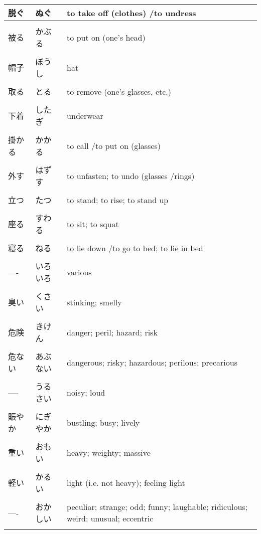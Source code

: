 \documentclass{article}
\begin{document}
\begin{tabular}{ l | p{4cm} p{12cm} }
脱ぐ & ぬぐ & to take off (clothes) /to undress \\ \hline\\[-1em]
被る & かぶる & to put on (one's head) \\ \hline\\[-1em]
帽子 & ぼうし & hat	 \\ \hline\\[-1em]
取る & とる & to remove (one's glasses, etc.) \\ \hline\\[-1em]
下着 & したぎ & underwear \\ \hline\\[-1em]
掛かる & かかる & to call /to put on (glasses) \\ \hline\\[-1em]
外す & はずす & to unfasten; to undo​ (glasses /rings) \\ \hline\\[-1em]
立つ & たつ & to stand; to rise; to stand up​  \\ \hline\\[-1em]
座る & すわる & to sit; to squat​ \\ \hline\\[-1em]
寝る & ねる & to lie down​ /to go to bed; to lie in bed​ \\ \hline\\[-1em]
---- & いろいろ & various \\ \hline\\[-1em]
臭い & くさい & stinking; smelly​ \\ \hline\\[-1em]
危険 & きけん & danger; peril; hazard​; risk \\ \hline\\[-1em]
危ない & あぶない & dangerous; risky; hazardous; perilous; precarious​ \\ \hline\\[-1em]
---- & うるさい & noisy; loud \\ \hline\\[-1em]
賑やか & にぎやか & bustling; busy; lively​ \\ \hline\\[-1em]
重い & おもい & heavy; weighty; massive​ \\ \hline\\[-1em]
軽い & かるい & light (i.e. not heavy); feeling light \\ \hline\\[-1em]
---- & おかしい & peculiar; strange; odd; funny; laughable; ridiculous; weird; unusual; eccentric​ \\ \hline\\[-1em]

\end{tabular}
\end{document}
